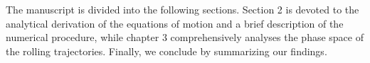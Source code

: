 The manuscript is divided into the following sections. Section 2 is devoted to the analytical derivation of the equations of motion and a brief description of the numerical procedure, while chapter 3 comprehensively analyses the phase space of the rolling trajectories. Finally, we conclude by summarizing our findings.